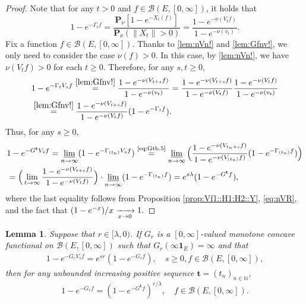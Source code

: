 \documentclass[12pt,a4paper]{amsart}
\numberwithin{equation}{section}
\theoremstyle{plain}
\newtheorem{lem}[thm]{Lemma}
\theoremstyle{definition}
\theoremstyle{remark}
\begin{document}
\begin{proof}
Note that for any $t>0$ and $f\in \mathcal B(E,[0,\infty])$, it holds that
\begin{equation}\label{lem:Gfnv!}
	1 - e^{- \Gamma_t f}
	= \frac{ \mathbf P_\nu [ 1 - e^{- X_t(f)}]}{ \mathbf P_\nu (\|X_t\| > 0)}
	= \frac{ 1 - e^{- \nu(V_tf)} }{ 1 - e^{- \nu(v_t)}}.
\end{equation}
Fix a function $f\in \mathcal B(E,[0,\infty])$.
Thanks to \eqref{lem:nVn!} and \eqref{lem:Gfnv!}, we only need to consider the case $\nu(f) > 0$.
	In this case, by \eqref{lem:nVn!}, we have $\nu(V_tf)>0$ for each $t\geq 0$.
	Therefore, for any $s,t\geq 0$,
	\begin{align}
	& 1 - e^{- \Gamma_t V_s f}
	\overset{\eqref{lem:Gfnv!}}= \frac{ 1 - e^{- \nu(V_{t+s} f)} }{ 1 - e^{- \nu(v_t)}}
	= \frac{ 1 - e^{- \nu(V_{t+s} f)} }{ 1 - e^{- \nu(V_tf)}} \frac{ 1 - e^{ - \nu(V_tf)}}{ 1 - e^{- \nu(v_t)}}
	\\ &  \label{eq:Gtb.5}\overset{\eqref{lem:Gfnv!}}= \frac{ 1 - e^{- \nu(V_{t+s} f)} }{ 1 - e^{- \nu(V_tf)}} ( 1 - e^{- \Gamma_t f}).
	\end{align}
	Thus, for any $s\geq 0$,
	\begin{align}
	& 1 - e^{- G^{\mathbf t} V_s f}
	= \varliminf_{n\to \infty} ( 1 - e^{- \Gamma_{(t_n)} V_s f})
	\overset{\text{\eqref{eq:Gtb.5}}}= \varliminf_{n\to \infty} \Big( \frac{ 1 - e^{- \nu(V_{t_n+s}f)}}{ 1 - e^{- \nu(V_{(t_n)}f)}} (1 - e^{- \Gamma_{(t_n)} f}) \Big)
	\\& = \Big( \lim_{t \to \infty} \frac{ 1 - e^{- \nu(V_{t+s}f)}}{ 1 - e^{- \nu(V_{t}f)}} \Big) \cdot \varliminf_{n\to \infty} (1 - e^{- \Gamma_{(t_n)} f} )
	= e^{s\lambda} (1 - e^{- G^{\mathbf t}f}),
	\end{align}
	where the last equality follows from Proposition \ref{prop:Vf1::H1:H2::Y}, \eqref{eq:nVR}, and the fact that
	$
	(1-e^{-x}) /x \xrightarrow[x\to 0]{} 1.
	\qedhere
	$
\end{proof}

\begin{lem} \label{prop:G*:H1:H2:H3:H4}
	Suppose that $r \in [\lambda,0)$.
	If $G_r$ is a $[0,\infty]$-valued monotone concave functional on $\mathcal B(E,[0,\infty])$ %
	such that $G_r(\infty \mathbf 1_E) = \infty$ and that
	\begin{align}
	1 - e^{-G_r V_s f}
	= e^{s r} (1 - e^{- G_r f}),
	\quad s\geq 0, f\in \mathcal B(E,[0,\infty]),
	\end{align}
	then for any unbounded increasing positive sequence $\mathbf t = (t_n)_{n\in \mathbb N}$,
\begin{equation}
	1 - e^{-G_r f} = (1 - e^{- G^\mathbf t f})^{r/\lambda}, \quad f \in \mathcal B(E,[0,\infty]).
\end{equation}
\end{lem}
\end{document}
